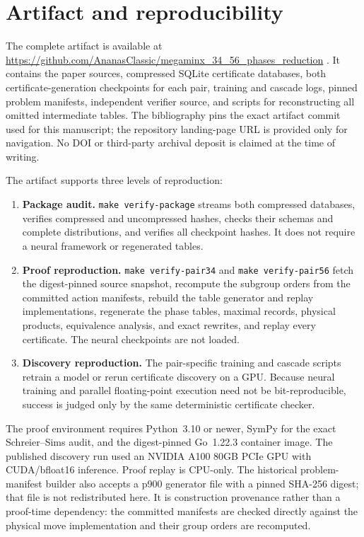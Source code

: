 \section{Artifact and reproducibility}
\label{sec:reproducibility}

The complete artifact is available at
\url{https://github.com/AnanasClassic/megaminx_34_56_phases_reduction}
\cite{kuznetsov2026artifact}.
It contains the paper sources, compressed SQLite certificate databases, both
certificate-generation checkpoints for each pair, training and cascade logs, pinned
problem manifests, independent verifier source, and scripts for reconstructing
all omitted intermediate tables.  The bibliography pins the exact artifact
commit used for this manuscript; the repository landing-page URL is provided
only for navigation.  No DOI or third-party archival deposit is claimed at the
time of writing.

The artifact supports three levels of reproduction:
\begin{enumerate}
  \item \textbf{Package audit.}  \texttt{make verify-package} streams both
    compressed databases, verifies compressed and uncompressed hashes, checks
    their schemas and complete distributions, and verifies all checkpoint
    hashes.  It does not require a neural framework or regenerated tables.
  \item \textbf{Proof reproduction.}  \texttt{make verify-pair34} and
    \texttt{make verify-pair56} fetch the digest-pinned source snapshot,
    recompute the subgroup orders from the committed action manifests, rebuild
    the table generator and replay implementations, regenerate the phase
    tables, maximal records, physical products, equivalence analysis, and exact
    rewrites, and replay every certificate.  The neural checkpoints are not
    loaded.
  \item \textbf{Discovery reproduction.}  The pair-specific training and
    cascade scripts retrain a model or rerun certificate discovery on a GPU.
    Because neural training and parallel floating-point execution need not be
    bit-reproducible, success is judged only by the same deterministic
    certificate checker.
\end{enumerate}

The proof environment requires Python~3.10 or newer, SymPy for the exact
Schreier--Sims audit, and the digest-pinned Go~1.22.3 container image.  The
published discovery run used an NVIDIA A100 80GB PCIe GPU with CUDA/bfloat16
inference.  Proof replay is CPU-only.  The historical problem-manifest builder
also accepts a p900 generator file with a pinned SHA-256 digest; that file is
not redistributed here.  It is construction provenance rather than a
proof-time dependency: the committed manifests are checked directly against
the physical move implementation and their group orders are recomputed.

